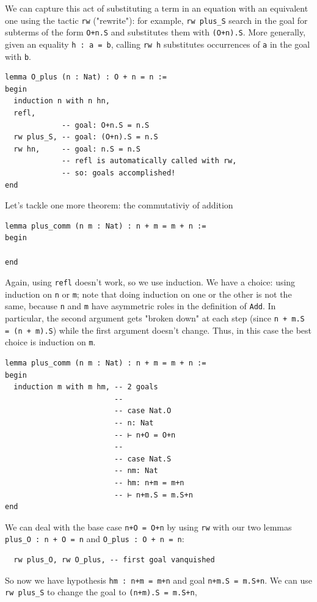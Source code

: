 \documentclass{book}
\theoremstyle{definition}
\theoremstyle{remark}
\theoremstyle{plain}
\begin{document}
We can capture this act of substituting a term in an equation with an equivalent one using the tactic \lstinline{rw} ("rewrite"):
for example, \lstinline{rw plus_S} search in the goal for subterms of the form \lstinline{O+n.S} and substitutes them with \lstinline{(O+n).S}.
More generally, given an equality \lstinline{h : a = b}, calling \lstinline{rw h} substitutes occurrences of \lstinline{a} in the goal with \lstinline{b}.
\begin{lstlisting}
lemma O_plus (n : Nat) : O + n = n :=
begin
  induction n with n hn,
  refl,
             -- goal: O+n.S = n.S
  rw plus_S, -- goal: (O+n).S = n.S
  rw hn,     -- goal: n.S = n.S
             -- refl is automatically called with rw,
             -- so: goals accomplished!
end
\end{lstlisting}
Let's tackle one more theorem: the commutativiy of addition
\begin{lstlisting}
lemma plus_comm (n m : Nat) : n + m = m + n :=
begin

end
\end{lstlisting}
Again, using \lstinline{refl} doesn't work, so we use induction.
We have a choice: using induction on \lstinline{n} or \lstinline{m};
note that doing induction on one or the other is not the same,
because \lstinline{n} and \lstinline{m} have asymmetric roles in the definition of \lstinline{Add}.
In particular, the second argument gets "broken down" at each step
(since \lstinline{n + m.S = (n + m).S}) while the first argument doesn't change.
Thus, in this case the best choice is induction on \lstinline{m}.
\begin{lstlisting}
lemma plus_comm (n m : Nat) : n + m = m + n :=
begin
  induction m with m hm, -- 2 goals
                         -- 
                         -- case Nat.O
                         -- n: Nat
                         -- ⊢ n+O = O+n
                         --
                         -- case Nat.S
                         -- nm: Nat
                         -- hm: n+m = m+n
                         -- ⊢ n+m.S = m.S+n
end
\end{lstlisting}
We can deal with the base case \lstinline{n+O = O+n} by using \lstinline{rw} with our two lemmas
\lstinline{plus_O : n + O = n} and \lstinline{O_plus : O + n = n}:
\begin{lstlisting}
  rw plus_O, rw O_plus, -- first goal vanquished
\end{lstlisting}
So now we have hypothesis \lstinline{hm : n+m = m+n} and goal \lstinline{n+m.S = m.S+n}.
We can use \lstinline{rw plus_S} to change the goal to \lstinline{(n+m).S = m.S+n},
\end{document}
